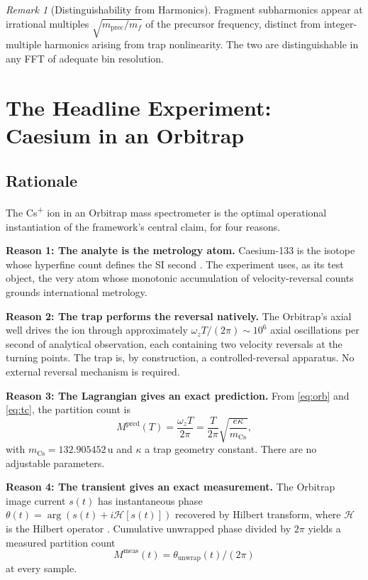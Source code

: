 \documentclass[twocolumn,10pt,a4paper]{article}
\theoremstyle{thmstyle}
\theoremstyle{definition}
\theoremstyle{remark}
\newtheorem{remark}[theorem]{Remark}
\begin{document}
\begin{remark}[Distinguishability from Harmonics]
\label{rem:harm}
Fragment subharmonics appear at irrational multiples
$\sqrt{m_{\mathrm{prec}}/m_{f}}$ of the precursor frequency, distinct
from integer-multiple harmonics arising from trap nonlinearity. The
two are distinguishable in any FFT of adequate bin resolution.
\end{remark}

\section{The Headline Experiment: Caesium in an Orbitrap}
\label{sec:experiment}

\subsection{Rationale}

The Cs\textsuperscript{+} ion in an Orbitrap mass spectrometer is the
optimal operational instantiation of the framework's central claim,
for four reasons.

\textbf{Reason 1: The analyte is the metrology atom.} Caesium-133 is
the isotope whose hyperfine count defines the SI second
\citep{si2019}. The experiment uses, as its test object, the very
atom whose monotonic accumulation of velocity-reversal counts grounds
international metrology.

\textbf{Reason 2: The trap performs the reversal natively.} The
Orbitrap's axial well drives the ion through approximately
$\omega_{z}T/(2\pi)\sim 10^{6}$ axial oscillations per second of
analytical observation, each containing two velocity reversals at the
turning points. The trap is, by construction, a controlled-reversal
apparatus. No external reversal mechanism is required.

\textbf{Reason 3: The Lagrangian gives an exact prediction.} From
\eqref{eq:orb} and \eqref{eq:tc}, the partition count is
\begin{equation}
M^{\mathrm{pred}}(T)=\frac{\omega_{z}T}{2\pi}=\frac{T}{2\pi}\sqrt{\frac{e\kappa}{m_{\mathrm{Cs}}}},
\label{eq:Mpred}
\end{equation}
with $m_{\mathrm{Cs}}=132.905452\,\mathrm{u}$ \citep{atomicmasses2020}
and $\kappa$ a trap geometry constant. There are no adjustable
parameters.

\textbf{Reason 4: The transient gives an exact measurement.} The
Orbitrap image current $s(t)$ has instantaneous phase
$\theta(t)=\arg(s(t)+i\mathcal{H}[s(t)])$ recovered by Hilbert
transform, where $\mathcal{H}$ is the Hilbert operator \citep{gabor1946}.
Cumulative unwrapped phase divided by $2\pi$ yields a measured
partition count
\begin{equation}
M^{\mathrm{meas}}(t)=\theta_{\mathrm{unwrap}}(t)/(2\pi)
\label{eq:Mmeas}
\end{equation}
at every sample.
\end{document}
